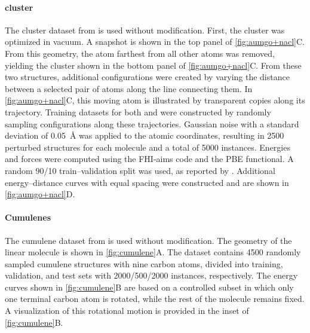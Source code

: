 \documentclass[10pt]{article}
\begin{document}
\paragraph{ cluster}
The  cluster dataset from \cite{kfgb2021} is used without modification.
First, the  cluster was optimized in vacuum. A snapshot is shown in the top panel of \cref{fig:aumgo+nacl}C. From this geometry, the  atom farthest from all other  atoms was removed, yielding the  cluster shown in the bottom panel of \cref{fig:aumgo+nacl}C.
From these two structures, additional configurations were created by varying the distance between a selected pair of  atoms along the line connecting them. In \cref{fig:aumgo+nacl}C, this moving atom is illustrated by transparent copies along its trajectory.
Training datasets for both  and  were constructed by randomly sampling configurations along these trajectories. Gaussian noise with a standard deviation of \qty{0.05}{\angstrom} was applied to the atomic coordinates, resulting in \num{2500} perturbed structures for each molecule and a total of \num{5000} instances. Energies and forces were computed using the FHI-aims code and the PBE functional.
A random \num{90}/\num{10} train–validation split was used, as reported by \cite{kfgb2021}. Additional energy–distance curves with equal spacing were constructed and are shown in \cref{fig:aumgo+nacl}D.

\paragraph{Cumulenes}
The cumulene dataset from \cite{ucsgpstm2021} is used without modification. The geometry of the linear molecule is shown in \cref{fig:cumulene}A. The dataset contains \num{4500} randomly sampled cumulene structures with nine carbon atoms, divided into training, validation, and test sets with \num{2000}/\num{500}/\num{2000} instances, respectively.
%
The energy curves shown in \cref{fig:cumulene}B are based on a controlled subset in which only one terminal carbon atom is rotated, while the rest of the molecule remains fixed. A visualization of this rotational motion is provided in the inset of \cref{fig:cumulene}B.
\end{document}
